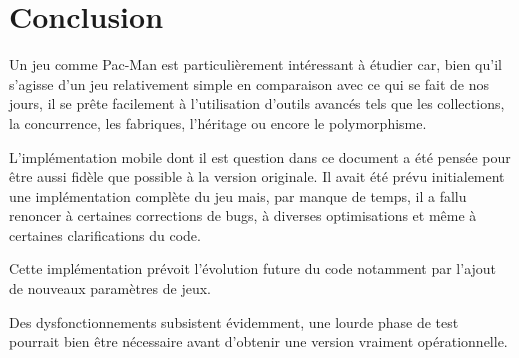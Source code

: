 \documentclass{article}
\begin{document}
\section{Conclusion}

Un jeu comme Pac-Man est particulièrement intéressant à étudier car, bien qu’il s’agisse d’un jeu relativement simple en comparaison avec ce qui se fait de nos jours, il se prête facilement à l’utilisation d’outils avancés tels que les collections, la concurrence, les fabriques, l’héritage ou encore le polymorphisme.

L’implémentation mobile dont il est question dans ce document a été pensée pour être aussi fidèle que possible à la version originale. Il avait été prévu initialement une implémentation complète du jeu mais, par manque de temps, il a fallu renoncer à certaines corrections de bugs, à diverses optimisations et même à certaines clarifications du code.

Cette implémentation prévoit l’évolution future du code notamment par l’ajout de nouveaux paramètres de jeux.

Des dysfonctionnements subsistent évidemment, une lourde phase de test pourrait bien être nécessaire avant d'obtenir une version vraiment opérationnelle.




\end{document}
